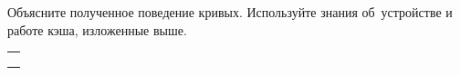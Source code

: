 Объясните полученное поведение кривых. Используйте знания об~устройстве и работе кэша, изложенные выше.



\WhatToReadSection
\begin{tabular}{@{}l@{}}
  \citeauthor[глава~3, стр.~390--398]{Harris:2015:ru} \\
  \citeauthor[глава~7, стр.~1091--1131; глава~8, стр.~1163--1240]{Harris:2015:ru} \\
  \citeauthor[глава~2, стр.~15--46]{Pacheco:2011:en}
\end{tabular}

